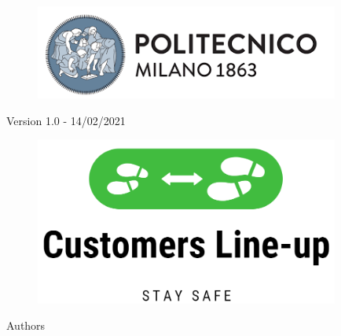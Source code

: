 \thispagestyle{empty}
\begin{center}

    \begin{figure}[!h] 
    \centering
    \includegraphics[width=100mm]{./Images/Polimilogo} 
     \end{figure}
    { \small {\mycourse} \par}
\vspace{0.3\baselineskip}
    {\bf \large{\mydep} \par}
\vspace{\baselineskip}
    { \Large {\bfseries {\mytitle}} \par}
\vspace{0.5\baselineskip}
	{ \small {Version 1.0 - 14/02/2021} \par}
\vspace{\baselineskip}
	\begin{figure}[!h] 
    \centering
    \includegraphics[width=100mm]{./Images/MockupLogo/LogoEnorme} 
     \end{figure}
\vspace{0.7\baselineskip}
\vspace{\baselineskip} 
    {Authors \par}
\vspace{0.4\baselineskip}
    {{\large {\bf \myname \\ \myrollno}} \par}

\end{center}
